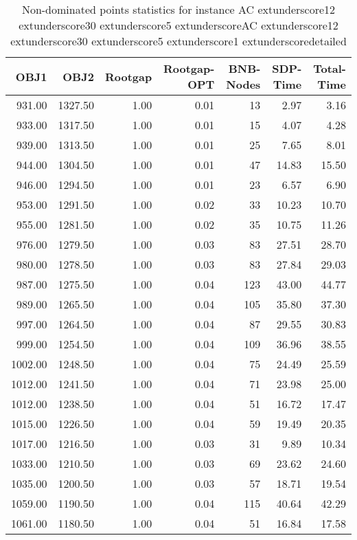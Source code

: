 \begin{table}
\caption{Non-dominated points statistics for instance AC	extunderscore12	extunderscore30	extunderscore5	extunderscoreAC	extunderscore12	extunderscore30	extunderscore5	extunderscore1	extunderscoredetailed}
\label{tab:stats/AC_12_30_5_AC_12_30_5_1_detailed}
\begin{tabular}{rrrrrrr}
\toprule
OBJ1 & OBJ2 & Rootgap & Rootgap-OPT & BNB-Nodes & SDP-Time & Total-Time \\
\midrule
931.00 & 1327.50 & 1.00 & 0.01 & 13 & 2.97 & 3.16 \\
933.00 & 1317.50 & 1.00 & 0.01 & 15 & 4.07 & 4.28 \\
939.00 & 1313.50 & 1.00 & 0.01 & 25 & 7.65 & 8.01 \\
944.00 & 1304.50 & 1.00 & 0.01 & 47 & 14.83 & 15.50 \\
946.00 & 1294.50 & 1.00 & 0.01 & 23 & 6.57 & 6.90 \\
953.00 & 1291.50 & 1.00 & 0.02 & 33 & 10.23 & 10.70 \\
955.00 & 1281.50 & 1.00 & 0.02 & 35 & 10.75 & 11.26 \\
976.00 & 1279.50 & 1.00 & 0.03 & 83 & 27.51 & 28.70 \\
980.00 & 1278.50 & 1.00 & 0.03 & 83 & 27.84 & 29.03 \\
987.00 & 1275.50 & 1.00 & 0.04 & 123 & 43.00 & 44.77 \\
989.00 & 1265.50 & 1.00 & 0.04 & 105 & 35.80 & 37.30 \\
997.00 & 1264.50 & 1.00 & 0.04 & 87 & 29.55 & 30.83 \\
999.00 & 1254.50 & 1.00 & 0.04 & 109 & 36.96 & 38.55 \\
1002.00 & 1248.50 & 1.00 & 0.04 & 75 & 24.49 & 25.59 \\
1012.00 & 1241.50 & 1.00 & 0.04 & 71 & 23.98 & 25.00 \\
1012.00 & 1238.50 & 1.00 & 0.04 & 51 & 16.72 & 17.47 \\
1015.00 & 1226.50 & 1.00 & 0.04 & 59 & 19.49 & 20.35 \\
1017.00 & 1216.50 & 1.00 & 0.03 & 31 & 9.89 & 10.34 \\
1033.00 & 1210.50 & 1.00 & 0.03 & 69 & 23.62 & 24.60 \\
1035.00 & 1200.50 & 1.00 & 0.03 & 57 & 18.71 & 19.54 \\
1059.00 & 1190.50 & 1.00 & 0.04 & 115 & 40.64 & 42.29 \\
1061.00 & 1180.50 & 1.00 & 0.04 & 51 & 16.84 & 17.58 \\

\end{tabular}
\end{table}
